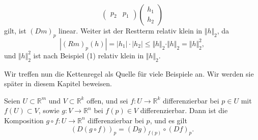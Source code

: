 \documentclass[../main.tex]{subfiles}
\begin{document}
\begin{examples}
\begin{enumerate}[(1)]
\[\begin{pmatrix}
          p_2 & p_1
        \end{pmatrix}
        \begin{pmatrix}
          h_1 \\ h_2
        \end{pmatrix}
      \]
      gilt, ist ${(Dm)}_p$ linear.
      Weiter ist der Restterm 
      relativ klein in $\Vert h \Vert_2$, da
      \[
        |{(Rm)}_p(h)| = |h_1| \cdot |h_2| \leq \Vert h \Vert_2 \cdot
        \Vert h \Vert_2 = \Vert h \Vert_2^2,
      \]
      und $\Vert h \Vert_2^2$ ist nach Beispiel (1)
      relativ klein in $\Vert h \Vert_2$.
  \end{enumerate}
\end{examples}

Wir treffen nun die Kettenregel als Quelle
für viele Beispiele an.
Wir werden sie später in diesem Kapitel beweisen.

\begin{theorem*}[Kettenregel]
  Seien $U \subset \mathbb{R}^m$ und $V \subset \mathbb{R}^k$ 
  offen, und sei $f \colon U \to \mathbb{R}^k$ differenzierbar
  bei $p \in U$ mit $f(U) \subset V$,
  sowie $g \colon V \to \mathbb{R}^n$ bei $f(p) \in V$ 
  differenzierbar.
  Dann ist die Komposition $g \circ f \colon U \to \mathbb{R}^n$ 
  differenzierbar bei $p$, und es gilt
  \[
    {(D(g \circ f))}_p = {(Dg)}_{f(p)} \circ {(Df)}_p.
  \]
\end{theorem*}
\end{document}
